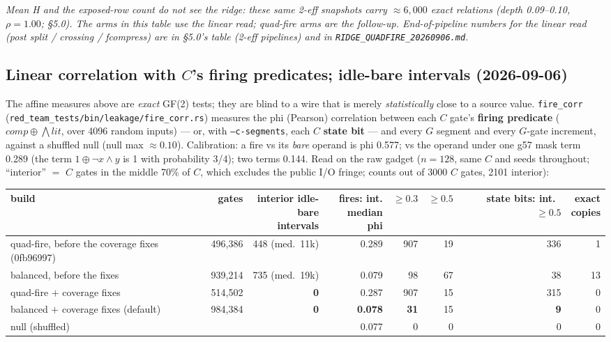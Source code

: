 \documentclass[11pt]{article}
\newcommand{\g}{\textsf{g57}}
\newcommand{\doc}[1]{\texttt{#1}}
\newcommand{\xor}{\oplus}
\begin{document}
\noindent\emph{Mean H and the exposed-row count do not see the ridge: these same
2-eff snapshots carry ${\approx}6{,}000$ exact relations (depth 0.09--0.10, $\rho=1.00$;
\S5.0). The arms in this table use the linear read; quad-fire arms are the follow-up.
End-of-pipeline numbers for the linear read (post split / crossing / fcompress) are in
\S5.0's table (2-eff pipelines) and in \doc{RIDGE\_QUADFIRE\_20260906.md}.}

\subsection{Linear correlation with $C$'s firing predicates; idle-bare intervals (2026-09-06)}

The affine measures above are \emph{exact} GF(2) tests; they are blind to a wire
that is merely \emph{statistically} close to a source value. \doc{fire\_corr}
(\doc{red\_team\_tests/bin/leakage/fire\_corr.rs}) measures the phi (Pearson)
correlation between each $C$ gate's \textbf{firing predicate} ($\mathit{comp} \xor
\bigwedge \mathit{lit}$, over 4096 random inputs) --- or, with \doc{--c-segments},
each $C$ \textbf{state bit} --- and every $G$ segment and every $G$-gate increment,
against a shuffled null (null max ${\approx}0.10$). Calibration: a fire vs its
\emph{bare} operand is phi 0.577; vs the operand under one \g{} mask term 0.289
(the term $1 \xor \neg x{\wedge}y$ is 1 with probability 3/4); two terms 0.144.
Read on the raw gadget ($n=128$, same $C$ and seeds throughout; ``interior'' $=$
$C$ gates in the middle 70\% of $C$, which excludes the public I/O fringe; counts
out of 3000 $C$ gates, 2101 interior):

\begin{center}\footnotesize
\begin{tabular}{@{}p{3.4cm}rrrrrrr@{}}
\toprule
build & gates & \shortstack[r]{interior idle-\\bare intervals} & \shortstack[r]{fires: int.\\median phi} & $\ge0.3$ & $\ge0.5$ & \shortstack[r]{state bits:\\int.\ $\ge0.5$} & \shortstack[r]{exact\\copies} \\
\midrule
quad-fire, before the coverage fixes (0fb96997) & 496,386 & 448 (med.\ 11k) & 0.289 & 907 & 19 & 336 & 1 \\
balanced, before the fixes & 939,214 & 735 (med.\ 19k) & 0.079 & 98 & 67 & 38 & 13 \\
quad-fire $+$ coverage fixes & 514,502 & \textbf{0} & 0.287 & 907 & 15 & 315 & 0 \\
balanced $+$ coverage fixes (default) & 984,384 & \textbf{0} & \textbf{0.078} & \textbf{31} & 15 & \textbf{9} & 0 \\
null (shuffled) & & & 0.077 & 0 & 0 & 0 & 0 \\
\bottomrule
\end{tabular}
\end{center}
\end{document}
